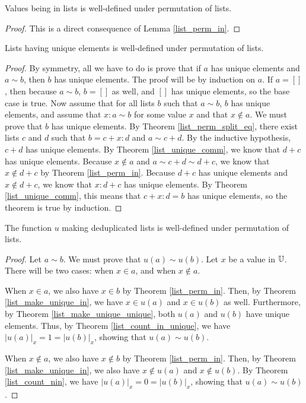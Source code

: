 \documentclass[../../math.tex]{subfiles}
\begin{document}
\begin{lemma}
    Values being in lists is well-defined under permutation of lists.
\end{lemma}
\begin{proof}
    This is a direct consequence of Lemma \ref{list_perm_in}.
\end{proof}

\begin{lemma}
    Lists having unique elements is well-defined under permutation of lists.
\end{lemma}
\begin{proof}
    By symmetry, all we have to do is prove that if $a$ has unique elements and
    $a \sim b$, then $b$ has unique elements.  The proof will be by induction on
    $a$.  If $a = []$, then because $a \sim b$, $b = []$ as well, and $[]$ has
    unique elements, so the base case is true.  Now assume that for all lists
    $b$ such that $a \sim b$, $b$ has unique elements, and assume that $x : a
    \sim b$ for some value $x$ and that $x \notin a$.  We must prove that $b$
    has unique elements.  By Theorem \ref{list_perm_split_eq}, there exist lists
    $c$ and $d$ such that $b = c + x : d$ and $a \sim c + d$.  By the inductive
    hypothesis, $c + d$ has unique elements.  By Theorem \ref{list_unique_comm},
    we know that $d + c$ has unique elements.  Because $x \notin a$ and $a \sim
    c + d \sim d + c$, we know that $x \notin d + c$ by Theorem
    \ref{list_perm_in}.  Because $d + c$ has unique elements and $x \notin d +
    c$, we know that $x : d + c$ has unique elements.  By Theorem
    \ref{list_unique_comm}, this means that $c + x : d = b$ has unique elements,
    so the theorem is true by induction.
\end{proof}

\begin{lemma}
    The function $u$ making deduplicated lists is well-defined under permutation
    of lists.
\end{lemma}
\begin{proof}
    Let $a \sim b$.  We must prove that $u(a) \sim u(b)$.  Let $x$ be a value in
    $\mathbb{U}$.  There will be two cases: when $x \in a$, and when $x \notin a$.

    When $x \in a$, we also have $x \in b$ by Theorem \ref{list_perm_in}.  Then,
    by Theorem \ref{list_make_unique_in}, we have $x \in u(a)$ and $x \in u(b)$
    as well.  Furthermore, by Theorem \ref{list_make_unique_unique}, both $u(a)$
    and $u(b)$ have unique elements.  Thus, by Theorem
    \ref{list_count_in_unique}, we have $|u(a)|_x = 1 = |u(b)|_x$, showing that
    $u(a) \sim u(b)$.

    When $x \notin a$, we also have $x \notin b$ by Theorem \ref{list_perm_in}.
    Then, by Theorem \ref{list_make_unique_in}, we also have $x \notin u(a)$ and
    $x \notin u(b)$.  By Theorem \ref{list_count_nin}, we have $|u(a)|_x = 0 =
    |u(b)|_x$, showing that $u(a) \sim u(b)$.
\end{proof}
\end{document}
